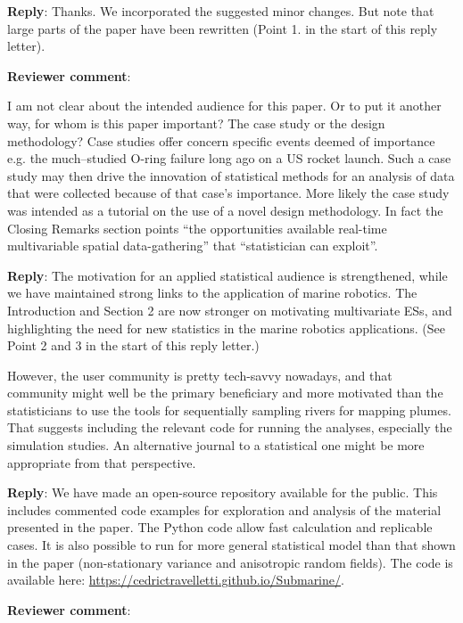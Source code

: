 \documentclass[a4paper]{article}
\def\revcom{\textbf{Reviewer comment}}
\def\reply{\textbf{Reply}}
\begin{document}
\begin{answers}
\reply: Thanks. We incorporated the suggested minor changes. But note that large parts of the paper have been rewritten (Point 1. in the start of this reply letter). 

\item{\revcom  :}\label{r1c4}

I am not clear about the intended audience for this paper. Or to put it another way, for whom is this paper important? The case study or the
design methodology? Case studies offer concern specific events deemed of importance e.g. the much–studied O-ring failure long ago on a US rocket launch. Such a case study may then drive the innovation of statistical methods for an analysis of data that were collected because of that case’s importance. More likely the case study was intended as a tutorial on the use of a novel design methodology. In fact the Closing Remarks section points “the opportunities available real-time multivariable spatial data-gathering” that “statistician can exploit”.

\reply: The motivation for an applied statistical audience is strengthened, while we have maintained strong links to the application of marine robotics. The Introduction and Section 2 are now stronger on motivating multivariate ESs, and highlighting the need for new statistics in the marine robotics applications. (See Point 2 and 3 in the start of this reply letter.)

However, the user community is pretty tech-savvy nowadays, and that community might well be the primary beneficiary and more motivated than the statisticians to use the tools for sequentially sampling rivers for mapping plumes. That suggests including the relevant code for running the analyses, especially the simulation studies. An alternative journal to a statistical one might be more appropriate from that perspective.

\reply: We have made an open-source repository available for the public. This includes commented code examples for exploration and analysis of the material presented in the paper. The Python code allow fast calculation and replicable cases. It is also possible to run for more general statistical model than that shown in the paper (non-stationary variance and anisotropic random fields). The code is available here: \url{https://cedrictravelletti.github.io/Submarine/}.

\item{\revcom :}\label{r1c5}


\end{answers}
\end{document}
